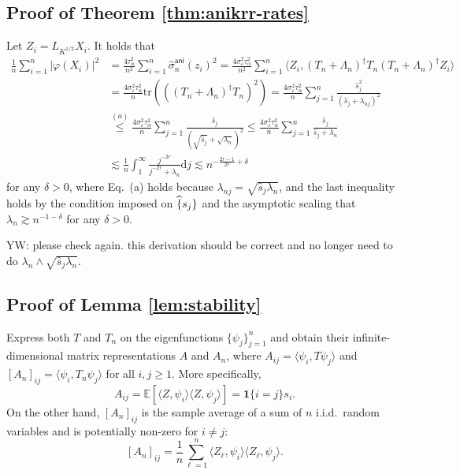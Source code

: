 \documentclass[aos]{imsart}
\renewcommand{\hat}{\widehat}
\newcommand{\vct}{\boldsymbol}
\newcommand{\tr}{\mathrm{tr}}
\newcommand{\ud}{\mathrm d}
\newcommand{\ani}{\mathsf{ani}}
\theoremstyle{plain}
\theoremstyle{definition}
\theoremstyle{definition}
\begin{document}
\begin{appendix}
\subsection{Proof of Theorem \ref{thm:anikrr-rates}}

Let $Z_i=L_{K^{1/2}}X_i$.
It holds that
\begin{align*}
\frac{1}{n}\sum_{i=1}^n\big|\varphi(X_i)\big|^2 &= \frac{4\tau_\alpha^2}{n^2}\sum_{i=1}^n\hat\sigma_n^\ani(z_i)^2 = \frac{4\sigma_\varepsilon^2\tau_\alpha^2}{n^2}\sum_{i=1}^n \langle Z_i, (T_n+\Lambda_n)^{\dagger}T_n(T_n+\Lambda_n)^{\dagger}Z_i\rangle\\
&= \frac{4\sigma_\varepsilon^2\tau_\alpha^2}{n}\tr(((T_n+\Lambda_n)^{\dagger}T_n)^2) = \frac{4\sigma_\varepsilon^2\tau_\alpha^2}{n}\sum_{j=1}^n\frac{\hat s_j^2}{(\hat s_j+\lambda_{nj})^2}\\
& \overset{(a)}{\leq} \frac{4\sigma_\varepsilon^2\tau_\alpha^2}{n}\sum_{j=1}^n\frac{\hat s_j}{(\sqrt{\hat s_j}+\sqrt{\lambda_n})^2} \leq \frac{4\sigma_\varepsilon^2\tau_\alpha^2}{n}\sum_{j=1}^n\frac{\hat s_j}{{\hat s_j}+{\lambda_n}} \\
&\lesssim \frac{1}{n}\int_1^{\infty} \frac{j^{-2r}}{j^{-2r}+\lambda_n}\ud j \lesssim n^{-\frac{2r-1}{2r}+\delta}
\end{align*}
for any $\delta>0$, where Eq.~(a) holds because $\lambda_{nj}= \sqrt{\hat s_j\lambda_n}$, and
the last inequality holds by the condition imposed on $\hat\{s_j\}$ and the asymptotic scaling that $\lambda_n\gtrsim n^{-1-\delta}$ for any $\delta>0$.

{\color{red} YW: please check again. this derivation should be correct and no longer need to do $\lambda_n\wedge\sqrt{\hat s_j\lambda_n}$.}




\subsection{Proof of Lemma \ref{lem:stability}}

Express both $T$ and $T_n$ on the eigenfunctions $\{\psi_j\}_{j=1}^n$ and obtain their infinite-dimensional matrix representations $A$ and $A_n$,
where $A_{ij}=\langle \psi_i,T\psi_j\rangle$ and $[A_n]_{ij}=\langle\psi_i, T_n\psi_j\rangle$ for all $i,j\geq 1$.
More specifically,
$$
A_{ij} = \mathbb E[\langle Z,\psi_i\rangle\langle Z,\psi_j\rangle] = \vct 1\{i=j\}s_i.
$$
On the other hand, $[A_n]_{ij}$ is the sample average of a sum of $n$ i.i.d.~random variables and is potentially non-zero for $i\neq j$:
$$
[A_n]_{ij} = \frac{1}{n}\sum_{\ell=1}^n \langle Z_\ell,\psi_i\rangle\langle Z_\ell,\psi_j\rangle.
$$


\end{appendix}
\end{document}
